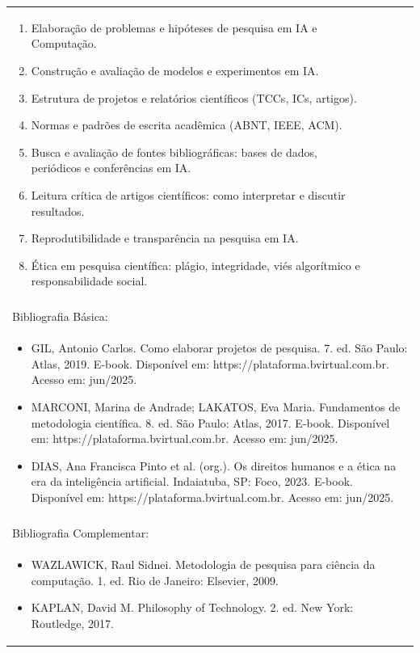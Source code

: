 \documentclass[11pt]{article}
\begin{document}
\begin{center}
\begin{longtable}{|p{4cm}|p{4cm}|p{4cm}|p{4cm}|}
{\begin{enumerate}
\item Elaboração de problemas e hipóteses de pesquisa em IA e Computação.
\item Construção e avaliação de modelos e experimentos em IA.
\item Estrutura de projetos e relatórios científicos (TCCs, ICs, artigos).
\item Normas e padrões de escrita acadêmica (ABNT, IEEE, ACM).
\item Busca e avaliação de fontes bibliográficas: bases de dados, periódicos e conferências em IA.
\item Leitura crítica de artigos científicos: como interpretar e discutir resultados.
\item Reprodutibilidade e transparência na pesquisa em IA.
\item Ética em pesquisa científica: plágio, integridade, viés algorítmico e responsabilidade social.\end{enumerate}}\\
\multicolumn{4}{|p{16cm}|}{}\\
\hline
\multicolumn{4}{|p{16cm}|}{Bibliografia Básica:}\\
\multicolumn{4}{|p{16cm}|}{%
\begin{itemize}\item GIL, Antonio Carlos. Como elaborar projetos de pesquisa. 7. ed. São Paulo: Atlas, 2019. E-book. Disponível em: https://plataforma.bvirtual.com.br. Acesso em: jun/2025.
\item MARCONI, Marina de Andrade; LAKATOS, Eva Maria. Fundamentos de metodologia científica. 8. ed. São Paulo: Atlas, 2017. E-book. Disponível em: https://plataforma.bvirtual.com.br. Acesso em: jun/2025.
\item DIAS, Ana Francisca Pinto et al. (org.). Os direitos humanos e a ética na era da inteligência artificial. Indaiatuba, SP: Foco, 2023. E-book. Disponível em: https://plataforma.bvirtual.com.br. Acesso em: jun/2025.\end{itemize}}\\
\multicolumn{4}{|p{16cm}|}{}\\
\hline
\multicolumn{4}{|p{16cm}|}{Bibliografia Complementar:}\\
\multicolumn{4}{|p{16cm}|}{%
\begin{itemize}\item WAZLAWICK, Raul Sidnei. Metodologia de pesquisa para ciência da computação. 1. ed. Rio de Janeiro: Elsevier, 2009.
\item KAPLAN, David M. Philosophy of Technology. 2. ed. New York: Routledge, 2017.

\end{itemize}}
\end{longtable}
\end{center}
\end{document}
